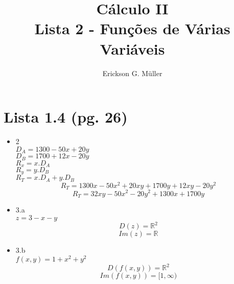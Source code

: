 \documentclass{article}
\title{Cálculo II\\Lista 2 - Funções de Várias Variáveis}
\author{Erickson G. Müller}
\date{}
\begin{document}
\maketitle
\section*{Lista 1.4 (pg. 26)}
	\begin{itemize}
		\item 2
			\\$D_A=1300-50x+20y$
			\\$D_B=1700+12x-20y$
			\\$R_x=x.D_A$
			\\$R_y=y.D_B$
			\\$R_T=x.D_A+y.D_B$
			$$R_T = 1300x-50x^2+20xy+1700y+12xy-20y^2$$
			$$R_T = 32xy-50x^2-20y^2+1300x+1700y$$
		\item 3.a \\$z=3-x-y$ %
			$$D(z)=\mathbb{R}^2$$%
			$$Im(z) = \mathbb{R}$$ %
		\item 3.b \\$f(x,y) = 1+x^2+y^2$
			$$D(f(x,y)) = \mathbb{R}^2$$
			$$Im(f(x,y)) = [1,\infty)$$
		

\end{itemize}
\end{document}

